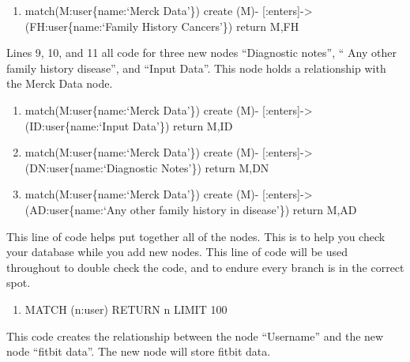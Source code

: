 \documentclass[]{book}
\providecommand{\tightlist}{%
  \setlength{\itemsep}{0pt}\setlength{\parskip}{0pt}}
\begin{document}
\begin{enumerate}
\def\labelenumi{\arabic{enumi}.}
\setcounter{enumi}{7}
\tightlist
\item
  match(M:user\{name:`Merck Data'\}) create (M)- {[}:enters{]}-\textgreater{} (FH:user\{name:`Family History Cancers'\}) return M,FH
\end{enumerate}

Lines 9, 10, and 11 all code for three new nodes ``Diagnostic notes'', `` Any other family history disease'', and ``Input Data''. This node holds a relationship with the Merck Data node.

\begin{enumerate}
\def\labelenumi{\arabic{enumi}.}
\setcounter{enumi}{8}
\tightlist
\item
  match(M:user\{name:`Merck Data'\}) create (M)- {[}:enters{]}-\textgreater{} (ID:user\{name:`Input Data'\}) return M,ID
\item
  match(M:user\{name:`Merck Data'\}) create (M)- {[}:enters{]}-\textgreater{} (DN:user\{name:`Diagnostic Notes'\}) return M,DN
\item
  match(M:user\{name:`Merck Data'\}) create (M)- {[}:enters{]}-\textgreater{} (AD:user\{name:`Any other family history in disease'\}) return M,AD
\end{enumerate}

This line of code helps put together all of the nodes. This is to help you check your database while you add new nodes. This line of code will be used throughout to double check the code, and to endure every branch is in the correct spot.

\begin{enumerate}
\def\labelenumi{\arabic{enumi}.}
\setcounter{enumi}{11}
\tightlist
\item
  MATCH (n:user) RETURN n LIMIT 100
\end{enumerate}

This code creates the relationship between the node ``Username'' and the new node ``fitbit data''. The new node will store fitbit data.
\end{document}

